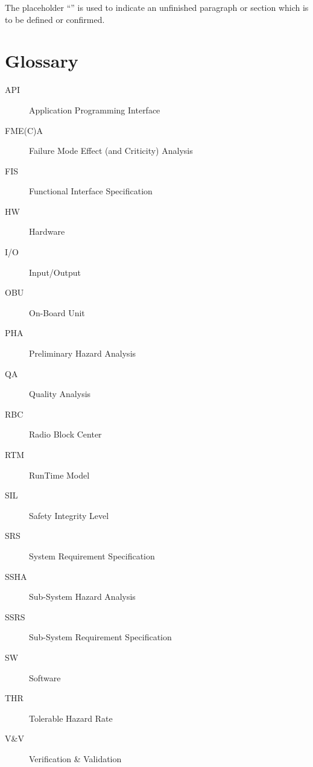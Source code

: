 The placeholder “” is used to indicate an unfinished  paragraph or section which is
to be defined or confirmed.


\section{Glossary}
\begin{description}
\item[API] Application Programming Interface
\item[FME(C)A] Failure Mode Effect (and Criticity) Analysis
\item[FIS] Functional Interface Specification
\item[HW] Hardware
\item[I/O] Input/Output
\item[OBU] On-Board Unit
\item[PHA] Preliminary Hazard Analysis
\item[QA] Quality Analysis
\item[RBC] Radio Block Center
\item[RTM] RunTime Model
\item[SIL] Safety Integrity Level
\item[SRS] System Requirement Specification
\item[SSHA] Sub-System Hazard Analysis
\item[SSRS] Sub-System Requirement Specification
\item[SW] Software
\item[THR] Tolerable Hazard Rate
\item[V\&V] Verification \& Validation
\end{description}
